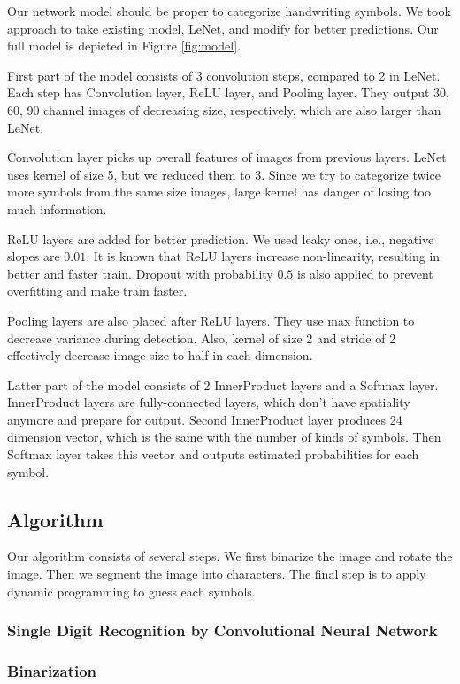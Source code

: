 \documentclass[10pt,twocolumn,letterpaper]{article}
\begin{document}
Our network model should be proper to categorize handwriting symbols.
We took approach to take existing model, LeNet, and modify for better predictions.
Our full model is depicted in Figure \ref{fig:model}.

First part of the model consists of 3 convolution steps, compared to 2 in LeNet.
Each step has Convolution layer, ReLU layer, and Pooling layer.
They output 30, 60, 90 channel images of decreasing size, respectively, which are also larger than LeNet.

Convolution layer picks up overall features of images from previous layers.
LeNet uses kernel of size 5, but we reduced them to 3.
Since we try to categorize twice more symbols from the same size images, large kernel has danger of losing too much information. 

ReLU layers are added for better prediction.
We used leaky ones, i.e., negative slopes are $0.01$.
It is known that ReLU layers increase non-linearity, resulting in better and faster train.
Dropout with probability $0.5$ is also applied to prevent overfitting and make train faster.

Pooling layers are also placed after ReLU layers.
They use max function to decrease variance during detection.
Also, kernel of size 2 and stride of 2 effectively decrease image size to half in each dimension.

Latter part of the model consists of 2 InnerProduct layers and a Softmax layer.
InnerProduct layers are fully-connected layers, which don't have spatiality anymore and prepare for output.
Second InnerProduct layer produces 24 dimension vector, which is the same with the number of kinds of symbols.
Then Softmax layer takes this vector and outputs estimated probabilities for each symbol.

\subsection{Algorithm}

Our algorithm consists of several steps. We first binarize the image and rotate the image.
Then we segment the image into characters.
The final step is to apply dynamic programming to guess each symbols.

\subsubsection{Single Digit Recognition by Convolutional Neural Network}

\subsubsection{Binarization}
\end{document}
